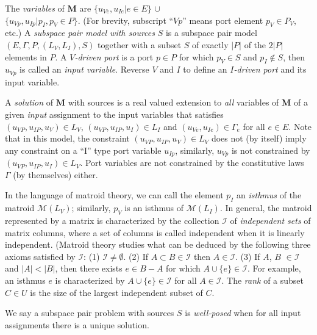 \documentclass{article}
\DeclareMathOperator{\rank}{rank}
\begin{document}
The \textit{variables} of $\mathbf{M}$ are 
$\{u_{Ve}, u_{Ie} | e \in E\}$  $\cup$ \\
$\{ u_{Vp}, u_{Ip} | p_I, p_V \in P \}$.  
(For brevity, subscript ``$Vp$'' means port element
$p_V\in P_V$, etc.)
A \textit{subspace pair model with sources} $S$ 
is a subspace pair model $(E, \Gamma, P, (L_V, L_I), S)$
together with a subset $S$ of exactly $|P|$ of the $2|P|$ elements
in $P$.  A \textit{$V$-driven port} is a port $p\in P$ for which 
$p_V\in S$ and $p_I\not\in S$, then $u_{Vp}$ is called 
an \textit{input variable}.   Reverse $V$ and $I$ to define an 
\textit{$I$-driven port} and its input variable.

A \textit{solution} of $\mathbf{M}$ with sources
is a real valued extension to \textit{all} variables of $\mathbf{M}$ 
of a given \textit{input} assignment to the input variables
that satisfies\\
$(u_{VP}, u_{IP}, u_V) \in L_V$,
$(u_{VP}, u_{IP}, u_I) \in L_I$
and
$(u_{Ve}, u_{Ie}) \in \Gamma_e$ for all
$e\in E$.  Note that in this model, the constraint 
$(u_{VP}, u_{IP}, u_V) \in L_V$ does not (by itself) imply any constraint
on a ``I'' type port variable $u_{Ip}$, similarly, $u_{Vp}$ is not constrained
by $(u_{VP}, u_{IP}, u_I) \in L_V$.  Port variables are not constrained
by the constitutive laws $\Gamma$ (by themselves) either.

In the language of matroid theory, we can call the element $p_I$ an 
\textit{isthmus} of the matroid $\mathcal{M}(L_V)$; similarly, $p_V$ is
an isthmus of $\mathcal{M}(L_I)$.  In general, the matroid represented by
a matrix is characterized by the collection $\mathcal{I}$ 
of \textit{independent sets} 
of matrix columns, where a set of columns is called independent when it is
linearly independent.  (Matroid theory studies what can be deduced by 
the following three axioms satisfied by $\mathcal{I}$: (1) 
$\mathcal{I}\neq\emptyset$. 
(2) If $A\subset B\in\mathcal{I}$ then $A\in\mathcal{I}$.  (3) 
If $A$, $B$ $\in\mathcal{I}$ and $|A|<|B|$, then there exists $e\in B-A$ 
for which $A\cup\{e\}\in\mathcal{I}$.  For example, an isthmus $e$ is 
characterized by $A\cup\{e\}\in\mathcal{I}$ for all $A\in\mathcal{I}$.
The \textit{rank} of a subset $C\in U$ is the size of the largest independent
subset of $C$.  

We say a subspace pair problem with sources $S$ 
is \textit{well-posed} when for all input assignments there is a unique 
solution.
\end{document}
